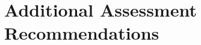 \section{Additional Assessment Recommendations}

\label{A_AAR}

\setcounter{myAAR}{1} 


     \clearpage
     \addtocounter{myAAR}{1}

\newpage
